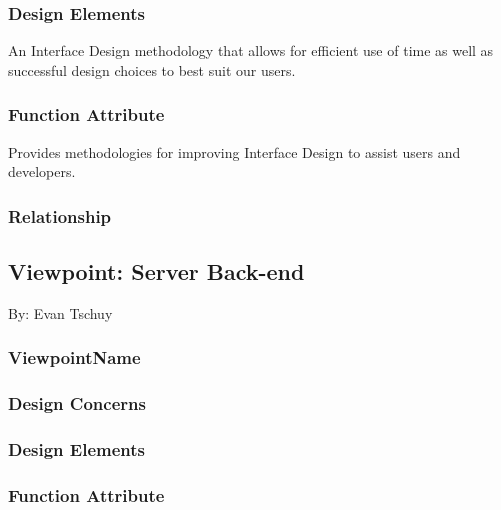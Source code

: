 \documentclass[letterpaper, 10pt, draftclsnofoot, compsoc, onecolumn]{IEEEtran}
\begin{document}
\subsubsection{Design Elements}
{\noindent An Interface Design methodology that allows for efficient
use of time as well as successful design choices to best suit our users. \par}

\subsubsection{Function Attribute}
{\noindent Provides methodologies for improving Interface Design to assist
users and developers. \par}

\subsubsection{Relationship}






\newpage
\subsection{Viewpoint: Server Back-end}
{\noindent By: Evan Tschuy \par}

\subsubsection{ViewpointName}
{\noindent  \par}

\subsubsection{Design Concerns}
{\noindent  \par}

\subsubsection{Design Elements}
{\noindent  \par}

\subsubsection{Function Attribute}
{\noindent  \par}
\end{document}
